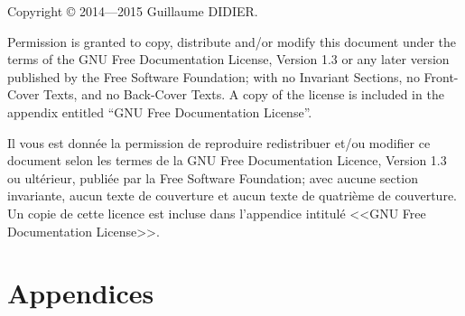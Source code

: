 
\title{\TSwiftTitle}

\newcommand{\TSwiftRoot}[0]{.} %


\frontmatter
\maketitle
\begin{otherlanguage}{english}
Copyright \copyright{}  2014---2015 Guillaume DIDIER.

Permission is granted to copy, distribute and/or modify this document
under the terms of the GNU Free Documentation License, Version 1.3
or any later version published by the Free Software Foundation;
with no Invariant Sections, no Front-Cover Texts, and no Back-Cover Texts.
A copy of the license is included in the appendix entitled ``GNU
Free Documentation License''.
\end{otherlanguage}

Il vous est donnée la permission de reproduire redistribuer et/ou modifier ce document selon les termes de la GNU Free Documentation Licence, Version 1.3 ou ultérieur, publiée par la Free Software Foundation; avec aucune section invariante, aucun texte de couverture et aucun texte de quatrième de couverture.
Un copie de cette licence est incluse dans l'appendice intitulé <<GNU Free Documentation License>>.



\tableofcontents


\mainmatter


\appendix
\part*{Appendices}


%
\backmatter


